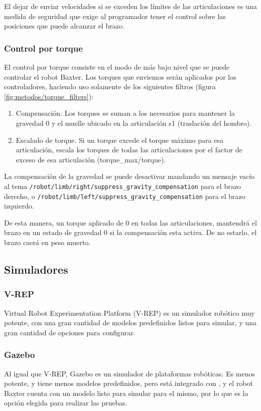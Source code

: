 El dejar de enviar velocidades si se exceden los límites de las articulaciones es una medida de seguridad que exige al programador tener el control sobre las posiciones que puede alcanzar el brazo.

\subsubsection{Control por torque}
El control por torque consiste en el modo de más bajo nivel que se puede controlar el robot Baxter. Los torques que enviemos serán aplicados por los controladores, haciendo uso solamente de los siguientes filtros (figura \ref{fig:metodos/torque_filters}):

\begin{enumerate}
\item {Compensación.} Los torques se suman a los necesarios para mantener la gravedad 0 y el muelle ubicado en la articulación s1 (traslación del hombro).
\item {Escalado de torque.} Si un torque excede el torque máximo para esa articulación, escala los torques de todas las articulaciones por el factor de exceso de esa articulación (torque\_max/torque).
\end{enumerate}

La compensación de la gravedad se puede desactivar mandando un mensaje vacío al tema \texttt{/robot\-/limb\-/right\-/suppress\_\-gravity\_\-compensation} para el brazo derecho, o \texttt{/robot\-/limb\-/left/\-suppress\_\-gravity\_\-compensation} para el brazo izquierdo.

De esta manera, un torque aplicado de 0 en todas las articulaciones, mantendrá el brazo en un estado de gravedad 0 si la compensación esta activa. De no estarlo, el brazo caerá en peso muerto.

\subsection{Simuladores}
\subsubsection{V-REP}
Virtual Robot Experimentation Platform (V-REP) \cite{vrep} es un simulador robótico muy potente, con una gran cantidad de modelos predefinidos listos para simular, y una gran cantidad de opciones para configurar.

\subsubsection{Gazebo}
Al igual que V-REP, Gazebo \cite{gazebo} es un simulador de plataformas robóticas. Es menos potente, y tiene menos modelos predefinidos, pero está integrado con \ros, y el robot Baxter cuenta con un modelo listo para simular para el mismo, por lo que es la opción elegida para realizar las pruebas.

